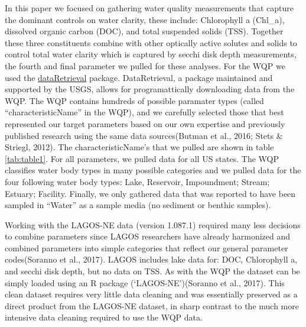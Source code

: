 \documentclass[]{article}
\begin{document}
In this paper we focused on gathering water quality measurements that
capture the dominant controls on water clarity, these include:
Chlorophyll a (Chl\_a), dissolved organic carbon (DOC), and total
suspended solids (TSS). Together these three constituents combine with
other optically active solutes and solids to control total water clarity
which is captured by secchi disk depth measurements, the fourth and
final parameter we pulled for these analyses. For the WQP we used the
\href{https://github.com/USGS-R/dataRetrieval}{dataRetrieval} package.
DataRetrieval, a package maintained and supported by the USGS, allows
for programattically downloading data from the WQP. The WQP contains
hundreds of possible paramater types (called ``characteristicName'' in
the WQP), and we carefully selected those that best represented our
target parameters based on our own expertise and previously published
research using the same data sources(Butman et al., 2016; Stets \&
Striegl, 2012). The characteristicName's that we pulled are shown in
table \ref{tab:table1}. For all parameters, we pulled data for all US
states. The WQP classifies water body types in many possible categories
and we pulled data for the four following water body types: Lake,
Reservoir, Impoundment; Stream; Estuary; Facility. Finally, we only
gathered data that was reported to have been sampled in ``Water'' as a
sample media (no sediment or benthic samples).

Working with the LAGOS-NE data (version 1.087.1) required many less
decisions to combine parameters since LAGOS researchers have already
harmonized and combined parameters into simple categories that reflect
our general parameter codes(Soranno et al., 2017). LAGOS includes lake
data for: DOC, Chlorophyll a, and secchi disk depth, but no data on TSS.
As with the WQP the dataset can be simply loaded using an R package
(`LAGOS-NE')(Soranno et al., 2017). This clean dataset requires very
little data cleaning and was essentially preserved as a direct product
from the LAGOS-NE dataset, in sharp contrast to the much more intensive
data cleaning required to use the WQP data.
\end{document}

